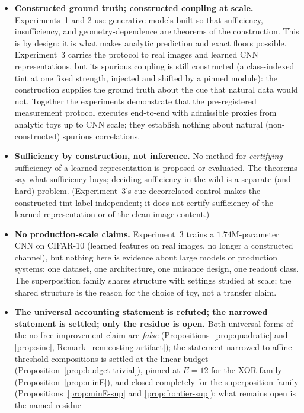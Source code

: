 \documentclass[twocolumn,10pt]{article}
\theoremstyle{definition}
\theoremstyle{remark}
\begin{document}
\begin{itemize}
\item \textbf{Constructed ground truth; constructed coupling at scale.}
Experiments~1 and 2 use generative models built so that sufficiency,
insufficiency, and geometry-dependence are theorems of the construction.
This is by design: it is what makes analytic prediction and exact floors
possible. Experiment~3 carries the protocol to real images and learned
CNN representations, but its spurious coupling is still constructed (a
class-indexed tint at one fixed strength, injected and shifted by a
pinned module): the construction supplies the ground truth about the
cue that natural data would not. Together the experiments demonstrate
that the pre-registered measurement protocol executes end-to-end with
admissible proxies from analytic toys up to CNN scale; they establish
nothing about natural (non-constructed) spurious correlations.
\item \textbf{Sufficiency by construction, not inference.} No method for
\emph{certifying} sufficiency of a learned representation is proposed or
evaluated. The theorems say what sufficiency buys; deciding sufficiency in
the wild is a separate (and hard) problem. (Experiment~3's
cue-decorrelated control makes the constructed tint label-independent;
it does not certify sufficiency of the learned representation or of the
clean image content.)
\item \textbf{No production-scale claims.} Experiment~3 trains a
$1.74$M-parameter CNN on CIFAR-10 (learned features on real images,
no longer a constructed channel), but nothing here is evidence about
large models or production systems: one dataset, one architecture, one
nuisance design, one readout class. The
superposition family shares structure with settings studied at scale; the
shared structure is the reason for the choice of toy, not a transfer claim.
\item \textbf{The universal accounting statement is refuted; the
narrowed statement is settled; only the residue is open.} Both
universal forms of the no-free-improvement claim are \emph{false}
(Propositions~\ref{prop:quadratic} and \ref{prop:sine},
Remark~\ref{rem:costing-artifact}); the statement narrowed to
affine-threshold compositions is settled at the linear budget
(Proposition~\ref{prop:budget-trivial}), pinned at $E = 12$ for the
XOR family (Proposition~\ref{prop:minE}), and closed completely for
the superposition family (Propositions~\ref{prop:minE-sup} and
\ref{prop:frontier-sup}); what remains open is the named residue

\end{itemize}
\end{document}
